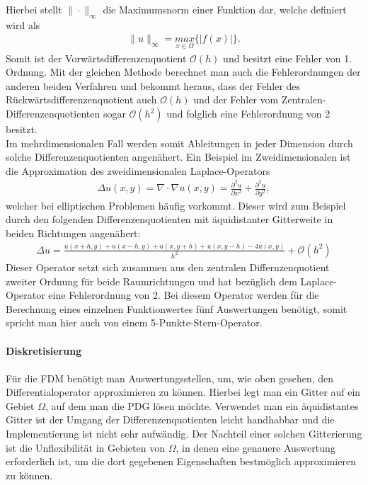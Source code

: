 \documentclass[a4paper,11pt]{article}
\begin{document}
Hierbei stellt $\|\cdot\|_{\infty}$ die Maximumsnorm einer Funktion dar, welche definiert wird als
\begin{align}
 \|u\|_{\infty}=\underset{x\in\Omega}{max}\{|f(x)|\}.\nonumber
\end{align}
Somit ist der Vorwärtsdifferenzenquotient $\mathcal{O}(h)$ und besitzt eine Fehler von 1. Ordnung. Mit der gleichen Methode berechnet man auch die Fehlerordnungen der anderen beiden Verfahren und bekommt heraus, dass der Fehler des Rückwärtsdifferenzenquotient auch $\mathcal{O}(h)$ und der Fehler vom Zentralen-Differenzenquotienten sogar $\mathcal{O}(h^2)$ und folglich eine Fehlerordnung von 2 besitzt.\\
Im mehrdimensionalen Fall werden somit Ableitungen in jeder Dimension durch solche Differenzenquotienten angenähert. Ein Beispiel im Zweidimensionalen ist die Approximation des zweidimensionalen Laplace-Operators
\begin{align}
 \Delta u(x,y)=\nabla\cdot\nabla u(x,y)=\frac{\partial^2u}{\partial x^2}+\frac{\partial^2u}{\partial y^2},
\end{align}
welcher bei elliptischen Problemen häufig vorkommt. Dieser wird zum Beispiel durch den folgenden Differenzenquotienten mit äquidistanter Gitterweite in beiden Richtungen angenähert:
 \small
\begin{align}
 \Delta u=\frac{u(x+h,y)+u(x-h,y)+u(x,y+h)+u(x,y-h)-4u(x,y)}{h^2}+\mathcal{O}(h^2)\nonumber
\end{align}
\normalsize
Dieser Operator setzt sich zusammen aus den zentralen Differnzenquotient zweiter Ordnung für beide Raumrichtungen und hat bezüglich dem Laplace-Operator eine Fehlerordnung von 2. Bei diesem Operator werden für die Berechnung eines einzelnen Funktionwertes fünf Auswertungen benötigt, somit spricht man hier auch von einem 5-Punkte-Stern-Operator.\\\\
\textbf{Diskretisierung}\\\\
Für die FDM benötigt man Auswertungsstellen, um, wie oben gesehen, den Differentialoperator approximieren zu können. Hierbei legt man ein Gitter auf ein Gebiet $\Omega$, auf dem man die PDG lösen möchte. Verwendet man ein äquidistantes Gitter ist der Umgang der Differenzenquotienten leicht handhabbar und die Implementierung ist nicht sehr aufwändig. Der Nachteil einer solchen Gitterierung ist die Unflexibilität in Gebieten von $\Omega$, in denen eine genauere Auswertung erforderlich ist, um die dort gegebenen Eigenschaften bestmöglich approximieren zu können.\\
\end{document}
